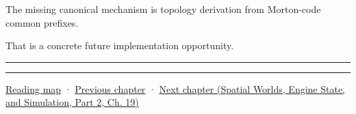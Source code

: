 The missing canonical mechanism is topology derivation from Morton-code common prefixes.

That is a concrete future implementation opportunity.

\begin{center}\rule{0.5\linewidth}{0.5pt}\end{center}

\begin{center}\rule{0.5\linewidth}{0.5pt}\end{center}

\hyperref[volume-reading-map]{Reading map} · \hyperref[06-engine-ii-ch026-descriptor-arrays-and-backend-limits]{Previous chapter} · \href{../05-Spatial-Worlds-Engine-State-and-Simulation-P02/main.pdf\#nameddest=06-engine-ii-ch028-bvh-traversal-refitting-and-simd}{Next chapter (Spatial Worlds, Engine State, and Simulation, Part 2, Ch. 19)}
